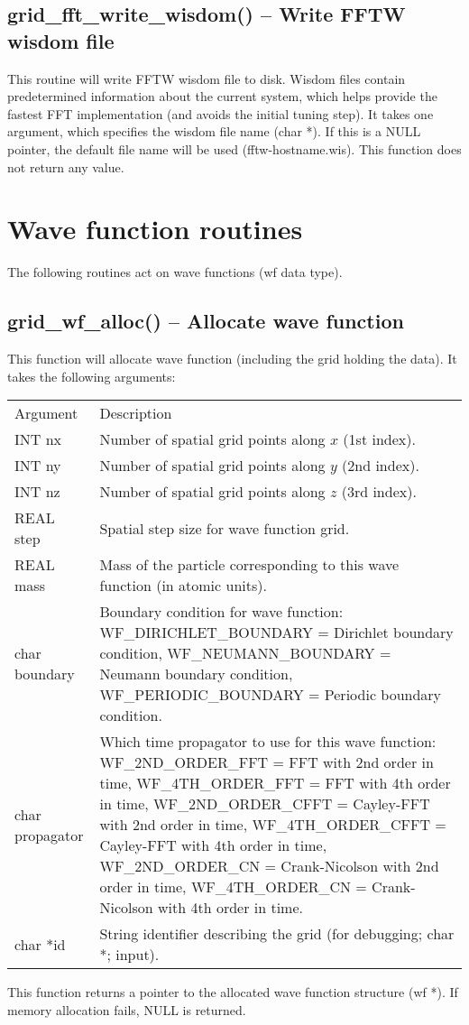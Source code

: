 \documentclass[12pt,letterpaper]{report}
\begin{document}
\subsection{grid\_fft\_write\_wisdom() -- Write FFTW wisdom file}

This routine will write FFTW wisdom file to disk. Wisdom files contain predetermined information about the current system, which helps provide the fastest FFT implementation (and avoids the initial tuning step).  It takes one argument, which specifies the wisdom file name (char *). If this is a NULL pointer, the default file name will be used (fftw-hostname.wis). This function does not return any value.

\section{Wave function routines}

The following routines act on wave functions (wf data type).

\subsection{grid\_wf\_alloc() -- Allocate wave function}

This function will allocate wave function (including the grid holding the data). It takes the following arguments:
\begin{longtable}{p{} p{}}
Argument & Description\\
\cline{1-2}
INT nx & Number of spatial grid points along $x$ (1st index).\\
INT ny & Number of spatial grid points along $y$ (2nd index).\\
INT nz & Number of spatial grid points along $z$ (3rd index).\\
REAL step & Spatial step size for wave function grid.\\
REAL mass & Mass of the particle corresponding to this wave function (in atomic units).\\
char boundary & Boundary condition for wave function: WF\_DIRICHLET\_BOUNDARY = Dirichlet boundary condition, WF\_NEUMANN\_BOUNDARY = Neumann boundary condition, WF\_PERIODIC\_BOUNDARY = Periodic boundary condition.\\
char propagator & Which time propagator to use for this wave function: WF\_2ND\_ORDER\_FFT = FFT with 2nd order in time, WF\_4TH\_ORDER\_FFT = FFT with 4th order in time, WF\_2ND\_ORDER\_CFFT = Cayley-FFT with 2nd order in time, WF\_4TH\_ORDER\_CFFT = Cayley-FFT with 4th order in time, WF\_2ND\_ORDER\_CN = Crank-Nicolson with 2nd order in time, WF\_4TH\_ORDER\_CN = Crank-Nicolson with 4th order in time.\\
char *id & String identifier describing the grid (for debugging; char *; input).
\end{longtable}
\noindent
This function returns a pointer to the allocated wave function structure (wf *). If memory allocation fails, NULL is returned.
\end{document}
